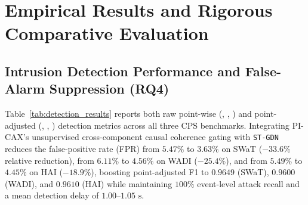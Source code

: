 \documentclass[10pt,a4paper]{article}
\begin{document}
\section{Empirical Results and Rigorous Comparative Evaluation}

\subsection{Intrusion Detection Performance and False-Alarm Suppression (RQ4)}

Table~\ref{tab:detection_results} reports both raw point-wise (, , ) and point-adjusted (, , ) detection metrics across all three CPS benchmarks. Integrating PI-CAX's unsupervised cross-component causal coherence gating with \texttt{ST-GDN} reduces the false-positive rate (FPR) from $5.47\%$ to $3.63\%$ on SWaT ($-33.6\%$ relative reduction), from $6.11\%$ to $4.56\%$ on WADI ($-25.4\%$), and from $5.49\%$ to $4.45\%$ on HAI ($-18.9\%$), boosting point-adjusted F1 to $0.9649$ (SWaT), $0.9600$ (WADI), and $0.9610$ (HAI) while maintaining $100\%$ event-level attack recall and a mean detection delay of $1.00\text{--}1.05\text{ s}$.
\end{document}

